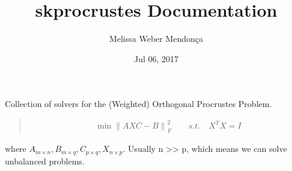 \documentclass[a4paper,10pt,english]{sphinxmanual}
\title{skprocrustes Documentation}
\date{Jul 06, 2017}
\author{Melissa Weber Mendonça}
\begin{document}
\maketitle
\sphinxtableofcontents
{}\label{\detokenize{index::doc}}


Collection of solvers for the (Weighted) Orthogonal Procrustes Problem.
\begin{quote}
\begin{equation*}
\begin{split}\min  {\| AXC-B \|}_F^2 \qquad s. t. \quad X^TX=I\end{split}
\end{equation*}\end{quote}

where \(A_{m \times n}, B_{m \times q}, C_{p \times q},
X_{n \times p}\). Usually n \textgreater{}\textgreater{} p, which means we can solve unbalanced problems.
\end{document}
